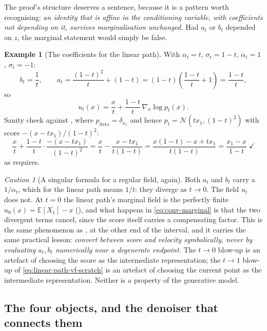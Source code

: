 \documentclass[11pt,a4paper]{report}
\theoremstyle{definition}
\newtheorem{example}[example]{Example}
\theoremstyle{remark}
\newtheorem{caution}[caution]{Caution}
\newcommand{\EE}{\mathbb E}
\begin{document}
The proof's structure deserves a sentence, because it is a pattern worth
recognising: \emph{an identity that is affine in the conditioning variable,
with coefficients not depending on it, survives marginalisation
unchanged.} Had $a_t$ or $b_t$ depended on $z$, the marginal statement
would simply be false.

\begin{example}[The coefficients for the linear path]
\label{ex:ab-condot}
With $\alpha_t=t$, $\sigma_t=1-t$, $\dot\alpha_t=1$, $\dot\sigma_t=-1$:
\[
b_t=\frac1t,
\qquad
a_t=\frac{(1-t)^2}{t}+(1-t) = (1-t)\left(\frac{1-t}{t}+1\right) = \frac{1-t}{t} ,
\]
so
\[
u_t(x) = \frac{x}{t} + \frac{1-t}{t}\,\nabla_x\log p_t(x) .
\]
Sanity check against , where
$p_{\mathrm{data}}=\delta_{x_1}$ and hence
$p_t=\mathcal N(tx_1,(1-t)^2)$ with score $-(x-tx_1)/(1-t)^2$:
\[
\frac{x}{t}+\frac{1-t}{t}\cdot\frac{-(x-tx_1)}{(1-t)^2}
= \frac{x}{t}-\frac{x-tx_1}{t(1-t)}
= \frac{x(1-t)-x+tx_1}{t(1-t)}
= \frac{x_1-x}{1-t}\;\checkmark
\]
as  requires.
\end{example}

\begin{caution}[A singular formula for a regular field, again]
\label{caution:score-form-singular}
Both $a_t$ and $b_t$ carry a $1/\alpha_t$, which for the linear path means
$1/t$: they diverge as $t\to0$. The field $u_t$ does not. At $t=0$ the
linear path's marginal field is the perfectly finite
$u_0(x)=\EE[X_1]-x$ (), and what happens in
\eqref{eq:conv-marginal} is that the two divergent terms cancel, since the
score itself carries a compensating factor. This is the same phenomenon as
, at the other end of the interval, and it
carries the same practical lesson: \emph{convert between score and velocity
symbolically, never by evaluating $a_t,b_t$ numerically near a degenerate
endpoint.} The $t\to0$ blow-up is an artefact of choosing the score as the
intermediate representation; the $t\to1$ blow-up of
\eqref{eq:linear-path-vf-scratch} is an artefact of choosing the current
point as the intermediate representation. Neither is a property of the
generative model.
\end{caution}

\subsection{The four objects, and the denoiser that connects them}
\end{document}
